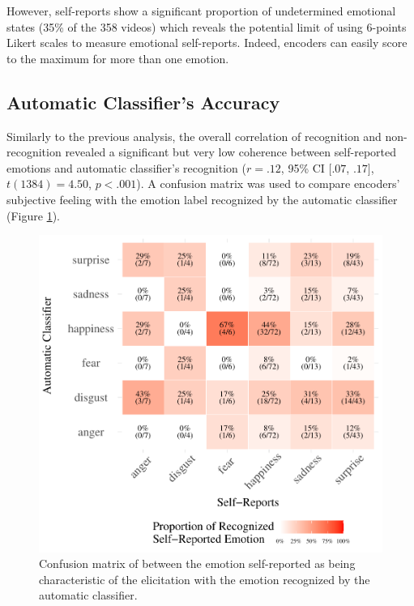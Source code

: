 \documentclass[
  english,
  doc]{apa7}
\begin{document}
However, self-reports show a significant proportion of undetermined emotional states (35\% of the 358 videos) which reveals the potential limit of using 6-points Likert scales to measure emotional self-reports. Indeed, encoders can easily score to the maximum for more than one emotion.

\hypertarget{automatic-classifiers-accuracy}{%
\subsection{Automatic Classifier's Accuracy}\label{automatic-classifiers-accuracy}}

Similarly to the previous analysis, the overall correlation of recognition and non-recognition revealed a significant but very low coherence between self-reported emotions and automatic classifier's recognition (\(r = .12\), 95\% CI \([.07\), \(.17]\), \(t(1384) = 4.50\), \(p < .001\)). A confusion matrix was used to compare encoders' subjective feeling with the emotion label recognized by the automatic classifier (Figure \ref{fig:confusionMatrix-sr-ar}).

\begin{figure}[!h]
\includegraphics[width=\textwidth]{manuscript_apa_files/figure-latex/confusionMatrix-sr-ar-1} \caption{Confusion matrix of between the emotion self-reported as being characteristic of the elicitation with the emotion recognized by the automatic classifier.}\label{fig:confusionMatrix-sr-ar}
\end{figure}
\end{document}

